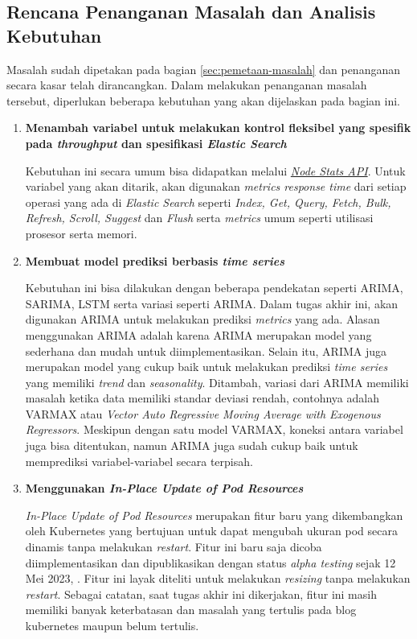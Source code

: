 \subsection{Rencana Penanganan Masalah dan Analisis Kebutuhan}

Masalah sudah dipetakan pada bagian \ref{sec:pemetaan-masalah} dan penanganan secara kasar telah dirancangkan. Dalam melakukan penanganan masalah tersebut, diperlukan beberapa kebutuhan yang akan dijelaskan pada bagian ini.

\begin{enumerate}
    \item \textbf{Menambah variabel untuk melakukan kontrol fleksibel yang spesifik pada \textit{throughput} dan spesifikasi \textit{Elastic Search}}
    
    Kebutuhan ini secara umum bisa didapatkan melalui \href{https://www.elastic.co/guide/en/elasticsearch/reference/current/cluster-nodes-stats.html}{\textit{Node Stats API}}. Untuk variabel yang akan ditarik, akan digunakan \textit{metrics response time} dari setiap operasi yang ada di \textit{Elastic Search} seperti \textit{Index, Get, Query, Fetch, Bulk, Refresh, Scroll, Suggest} dan \textit{Flush} serta \textit{metrics} umum seperti utilisasi prosesor serta memori.

    \item \textbf{Membuat model prediksi berbasis \textit{time series}}
    
    Kebutuhan ini bisa dilakukan dengan beberapa pendekatan seperti ARIMA, SARIMA, LSTM serta variasi seperti ARIMA. Dalam tugas akhir ini, akan digunakan ARIMA untuk melakukan prediksi \textit{metrics} yang ada. Alasan menggunakan ARIMA adalah karena ARIMA merupakan model yang sederhana dan mudah untuk diimplementasikan. Selain itu, ARIMA juga merupakan model yang cukup baik untuk melakukan prediksi \textit{time series} yang memiliki \textit{trend} dan \textit{seasonality}. Ditambah, variasi dari ARIMA memiliki masalah ketika data memiliki standar deviasi rendah, contohnya adalah VARMAX atau \textit{Vector Auto Regressive Moving Average with Exogenous Regressors}. Meskipun dengan satu model VARMAX, koneksi antara variabel juga bisa ditentukan, namun ARIMA juga sudah cukup baik untuk memprediksi variabel-variabel secara terpisah.

    \item \textbf{Menggunakan \textit{In-Place Update of Pod Resources}}

    \textit{In-Place Update of Pod Resources} merupakan fitur baru yang dikembangkan oleh Kubernetes yang bertujuan untuk dapat mengubah ukuran pod secara dinamis tanpa melakukan \textit{restart}. Fitur ini baru saja dicoba diimplementasikan dan dipublikasikan dengan status \textit{alpha testing} sejak 12 Mei 2023, \parencite{kubeinplaceupdate}. Fitur ini layak diteliti untuk melakukan \textit{resizing} tanpa melakukan \textit{restart}. Sebagai catatan, saat tugas akhir ini dikerjakan, fitur ini masih memiliki banyak keterbatasan dan masalah yang tertulis pada blog kubernetes maupun belum tertulis.


\end{enumerate}
